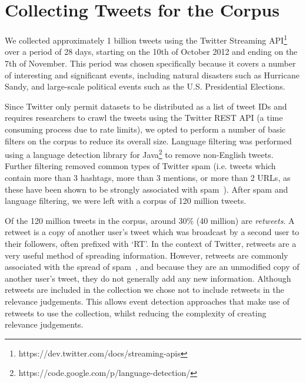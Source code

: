 

\section{Collecting Tweets for the Corpus}
\label{sec:methodology}
\label{collection:sec:methodology}
We collected approximately 1 billion tweets using the Twitter Streaming API\footnote{https://dev.twitter.com/docs/streaming-apis} over a period of 28 days, starting on the 10th of October 2012 and ending on the 7th of November.
This period was chosen specifically because it covers a number of interesting and significant events, including natural disasters such as Hurricane Sandy, and large-scale political events such as the U.S. Presidential Elections.

Since Twitter only permit datasets to be distributed as a list of tweet IDs and requires researchers to crawl the tweets using the Twitter REST API (a time consuming process due to rate limits), we opted to perform a number of basic filters on the corpus to reduce its overall size.
Language filtering was performed using a language detection library for Java\footnote{https://code.google.com/p/language-detection/} to remove non-English tweets.
Further filtering removed common types of Twitter spam (i.e. tweets which contain more than 3 hashtags, more than 3 mentions, or more than 2 URLs, as these have been shown to be strongly associated with spam~\citep{benevenuto2010detecting}).
After spam and language filtering, we were left with a corpus of 120 million tweets.

Of the 120 million tweets in the corpus, around 30\% (40 million) are \emph{retweets}.
A retweet is a copy of another user's tweet which was broadcast by a second user to their followers, often prefixed with `RT'.
In the context of Twitter, retweets are a very useful method of spreading information.
However, retweets are commonly associated with the spread of spam~\citep{5428313}, and because they are an unmodified copy of another user's tweet, they do not generally add any new information.
Although retweets are included in the collection we chose not to include retweets in the relevance judgements.
This allows event detection approaches that make use of retweets to use the collection, whilst reducing the complexity of creating relevance judgements.


